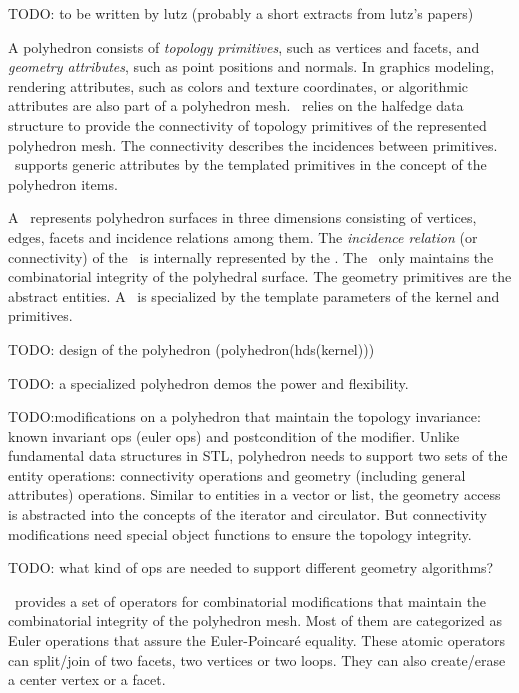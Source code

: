 TODO: to be written by lutz (probably a short extracts from lutz's papers)

A polyhedron consists of \emph{topology primitives}, such as vertices
and facets, and \emph{geometry attributes}, such as point positions
and normals.  In graphics modeling, rendering attributes, such as
colors and texture coordinates, or algorithmic attributes are also
part of a polyhedron mesh. \cgalpoly\ relies on the halfedge data
structure \cite{hds} to provide the connectivity of topology
primitives of the represented polyhedron mesh.  The connectivity
describes the incidences between primitives. \poly\ supports generic
attributes by the templated primitives in the concept of the
polyhedron items.


A \cgalpoly\ represents polyhedron surfaces in three dimensions
consisting of vertices, edges, facets and incidence relations among
them.  The \emph{incidence relation} (or connectivity) of the \poly\
is internally represented by the \cgalhds.  The \poly\ only maintains
the combinatorial integrity of the polyhedral surface. The geometry
primitives are the abstract entities. A \poly\ is specialized by the
template parameters of the kernel and primitives.

TODO: design of the polyhedron (polyhedron(hds(kernel)))

TODO: a specialized polyhedron demos the power and flexibility.


TODO:modifications on a polyhedron that maintain the topology
invariance: known invariant ops (euler ops) and postcondition of the
modifier. Unlike fundamental data structures in STL, polyhedron needs
to support two sets of the entity operations: connectivity operations
and geometry (including general attributes) operations. Similar to
entities in a vector or list, the geometry access is abstracted into
the concepts of the iterator and circulator.  But connectivity
modifications need special object functions to ensure the topology
integrity.

TODO: what kind of ops are needed to support different geometry algorithms?

\cgalpoly\ provides a set of operators for combinatorial 
modifications that maintain the combinatorial integrity of the
polyhedron mesh. Most of them are categorized as Euler operations that
assure the Euler-Poincar\'e equality.  These atomic operators can
split/join of two facets, two vertices or two loops. They can also
create/erase a center vertex or a facet.

